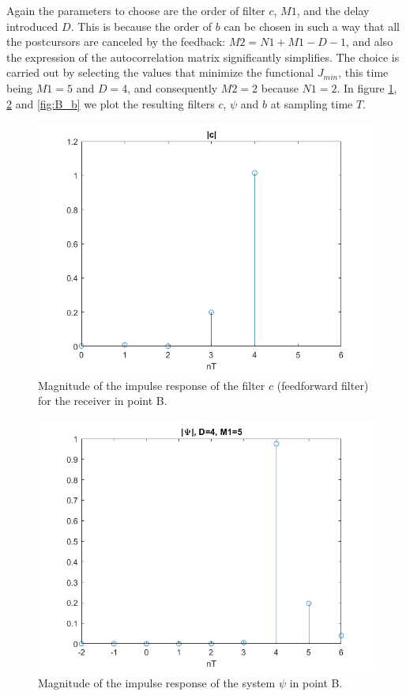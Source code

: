 \documentclass[a4paper,11.5pt]{article}
\begin{document}
Again the parameters to choose are the order of filter $c$, $M1$, and the delay introduced $D$. This is because the order of $b$ can be chosen in such a way that all the postcursors are canceled by the feedback: $M2=N1+M1-D-1$, and also the expression of the autocorrelation matrix significantly simplifies. The choice is carried out by selecting the values that minimize the functional $J_{min}$, this time being $M1=5$ and $D=4$, and consequently $M2=2$ because $N1=2$. In figure \ref{fig:B_c}, \ref{fig:B_psi} and \ref{fig:B_b} we plot the resulting filters $c$, $\psi$ and $b$ at sampling time $T$. 

\begin{figure}[ht]
	\begin{center}   
		\includegraphics[width=\textwidth]{figs/B_c.png} 
		\caption{Magnitude of the impulse response of the filter $c$ (feedforward filter) for the receiver in point B.}
		\label{fig:B_c}
	\end{center}
\end{figure}

\begin{figure}[ht]
	\begin{center}   
		\includegraphics[width=\textwidth]{figs/B_psi.png} 
		\caption{Magnitude of the impulse response of the system $\psi$ in point B.}
		\label{fig:B_psi}
	\end{center}
\end{figure}
\end{document}
